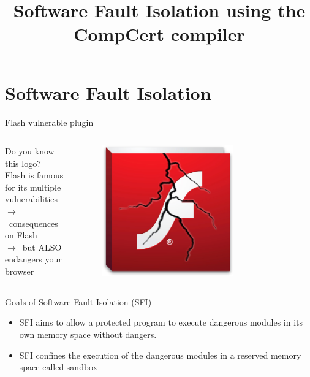 \documentclass{beamer}
\title{Software Fault Isolation using the CompCert compiler}
\author[\textit{Author}:~Alexandre Dang \and \textit{Supervisor}:~Frédéric Besson]
{%
	\texorpdfstring{
		\begin{columns}[t]
			\column{.45\linewidth}
				\begin{center}
				\textit{Author}: Alexandre Dang
				\end{center}
			\column{.45\linewidth}
				\begin{center}
				\textit{Supervisor}: Frédéric Besson
				\end{center}
		\end{columns}
	}
	{\textit{Auteur}: Alexandre Dang, \textit{Superviseur}: Frédéric Besson, \textit{\'Equipe}: Celtique}
}
\institute{Team Celtique}
\begin{document}
\frame{\titlepage}
 

\section{Software Fault Isolation}
\label{sec:Software Fault Isolation}



\begin{frame}{Flash vulnerable plugin}
	\begin{columns}[onlytextwidth]
		\begin{column}{0.5\textwidth}
			Do you know this logo?\\
			\vspace{5mm}
			Flash is famous for its multiple vulnerabilities\\
			$\rightarrow$~consequences on Flash\\
			$\rightarrow$~but ALSO endangers your browser
		\end{column}
		\begin{column}{0.5\textwidth}
			\begin{figure}
				\centering
				\includegraphics[width=0.7\textwidth]{images/flash.jpg}
			\end{figure}
		\end{column}
	\end{columns}
\end{frame}


\begin{frame}{Goals of Software Fault Isolation (SFI)~\cite{Wahbe:1993:ESF:173668.168635}}
	\begin{itemize}\itemsep20pt
		\item SFI aims to allow a protected program to execute dangerous modules in its own memory space without dangers. 
		\item SFI confines the execution of the dangerous modules in a reserved memory space called sandbox
	\end{itemize}
\end{frame}
\end{document}

